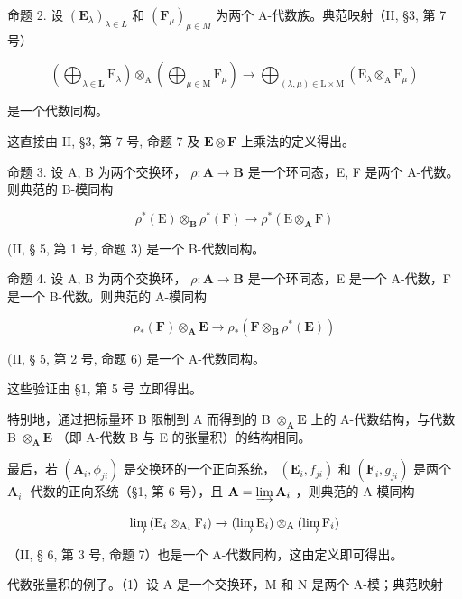 命题 2. 设 \((\mathbf{E}_{\lambda})_{\lambda \in L}\) 和 \((\mathbf{F}_{\mu})_{\mu \in M}\) 为两个 A-代数族。典范映射（II, §3, 第 7 号）

\[
\left(\bigoplus_ {\lambda \in \mathbf {L}} \mathrm{E} _ {\lambda}\right) \otimes_ {\mathrm{A}} \left(\bigoplus_ {\mu \in \mathrm{M}} \mathrm{F} _ {\mu}\right)\rightarrow \bigoplus_ {(\lambda , \mu) \in \mathrm{L} \times \mathrm{M}} \left(\mathrm{E} _ {\lambda} \otimes_ {\mathrm{A}} \mathrm{F} _ {\mu}\right)
\]

是一个代数同构。

这直接由 II, §3, 第 7 号, 命题 7 及 \(\mathbf{E} \otimes \mathbf{F}\) 上乘法的定义得出。

命题 3. 设 A, B 为两个交换环， \(\rho: \mathbf{A} \to \mathbf{B}\) 是一个环同态，E, F 是两个 A-代数。则典范的 B-模同构

\[
\rho^ {*} (\mathrm{E}) \otimes_ {\mathbf {B}} \rho^ {*} (\mathrm{F}) \rightarrow \rho^ {*} (\mathrm{E} \otimes_ {\mathbf {A}} \mathrm{F})
\]

(II, § 5, 第 1 号, 命题 3) 是一个 B-代数同构。

命题 4. 设 A, B 为两个交换环， \(\rho: \mathbf{A} \to \mathbf{B}\) 是一个环同态，E 是一个 A-代数，F 是一个 B-代数。则典范的 A-模同构

\[
\rho_ {*} (\mathbf {F}) \otimes_ {\mathbf {A}} \mathbf {E} \rightarrow \rho_ {*} (\mathbf {F} \otimes_ {\mathbf {B}} \rho^ {*} (\mathbf {E}))
\]

(II, § 5, 第 2 号, 命题 6) 是一个 A-代数同构。

这些验证由 §1, 第 5 号 立即得出。

特别地，通过把标量环 B 限制到 A 而得到的 B \(\otimes_{\mathbf{A}} \mathbf{E}\) 上的 A-代数结构，与代数 B \(\otimes_{\mathbf{A}} \mathbf{E}\) （即 A-代数 B 与 E 的张量积）的结构相同。

最后，若 \((\mathbf{A}_i, \phi_{ji})\) 是交换环的一个正向系统， \((\mathbf{E}_i, f_{ji})\) 和 \((\mathbf{F}_i, g_{ji})\) 是两个 \(\mathbf{A}_i\) -代数的正向系统（§1, 第 6 号），且 \(\mathbf{A} = \varinjlim \mathbf{A}_i\) ，则典范的 A-模同构

\[
\varinjlim \left(\mathrm{E} _ {i} \otimes_ {\mathrm{A} _ {i}} \mathrm{F} _ {i}\right)\rightarrow (\varinjlim \mathrm{E} _ {i}) \otimes_ {\mathrm{A}} (\varinjlim \mathrm{F} _ {i})
\]

（II, § 6, 第 3 号, 命题 7）也是一个 A-代数同构，这由定义即可得出。

代数张量积的例子。（1）设 A 是一个交换环，M 和 N 是两个 A-模；典范映射

